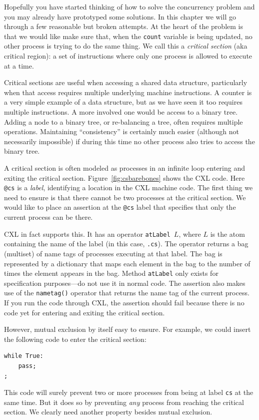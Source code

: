 \documentclass{report}
\newenvironment{code}{
\tcolorbox
}{
\endtcolorbox
}
\begin{document}
Hopefully you have started thinking of how to solve the concurrency
problem and you may already have prototyped some solutions.
In this chapter we will go through a few reasonable but broken attempts.
At the heart of the problem is that we would like make sure that, when
the \texttt{count} variable is being updated, no other process is
trying to do the same thing.  We call this a \emph{critical section}
(aka critical region): a
set of instructions where only one process is allowed to execute at a
time.

Critical sections are useful when accessing a shared data
structure, particularly when that access requires multiple underlying
machine instructions.  A counter is a very simple example of
a data structure, but as we have seen it too requires multiple instructions.
A more involved one would be access to a binary tree.
Adding a node to a binary tree, or re-balancing a tree, often requires
multiple operations.  Maintaining ``consistency'' is certainly much easier
(although not necessarily impossible) if during this time no other
process also tries to access the binary tree.

A critical section is often modeled as processes in an infinite loop
entering and exiting the critical section.
Figure~\ref{fig:csbarebones} shows the CXL code.
Here \texttt{@cs} is a \emph{label}, identifying
a location in the CXL machine code.  The first thing we need to
ensure is that there cannot be two processes at the critical section.
We would like to place an assertion at the \texttt{@cs} label that
specifies that only the current process can be there.

CXL in fact supports this.
It has an operator \texttt{atLabel $L$}, where $L$
is the atom containing the name of the label (in this case, \texttt{.cs}).
The operator returns a bag (multiset) of name tags of processes executing at that
label.  The bag is represented by a dictionary that maps each element
in the bag to the number of times the element appears in the bag.
Method \texttt{atLabel} only exists for specification purposes---do not
use it in normal code.
The assertion also makes use of the \texttt{nametag()} operator that
returns the name tag of the current process.
If you run the code through CXL, the assertion should fail because
there is no code yet for entering and exiting the critical section.

However, mutual exclusion by itself easy to ensure.
For example, we could insert the following code to enter the
critical section:
\begin{code}
\begin{verbatim}
while True:
    pass;
;
\end{verbatim}
\end{code}
This code will surely prevent two or more processes from being
at label \texttt{cs} at the same time.
But it does so by preventing \emph{any} process from reaching
the critical section.
We clearly need another property besides mutual exclusion.
\end{document}

